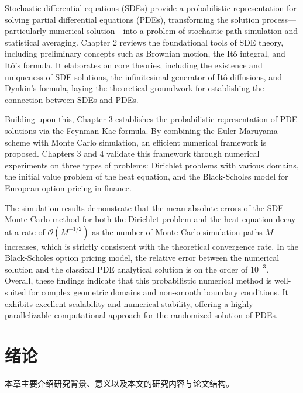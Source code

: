 \documentclass[oneside]{sysuthesis}
\begin{document}
\begin{abstract*}
  Stochastic differential equations (SDEs) provide a probabilistic representation for solving partial differential equations (PDEs), transforming the solution process—particularly numerical solution—into a problem of stochastic path simulation and statistical averaging. Chapter 2 reviews the foundational tools of SDE theory, including preliminary concepts such as Brownian motion, the It\^o integral, and It\^o's formula. It elaborates on core theories, including the existence and uniqueness of SDE solutions, the infinitesimal generator of It\^o diffusions, and Dynkin's formula, laying the theoretical groundwork for establishing the connection between SDEs and PDEs.
  
  Building upon this, Chapter 3 establishes the probabilistic representation of PDE solutions via the Feynman-Kac formula. By combining the Euler-Maruyama scheme with Monte Carlo simulation, an efficient numerical framework is proposed. Chapters 3 and 4 validate this framework through numerical experiments on three types of problems: Dirichlet problems with various domains, the initial value problem of the heat equation, and the Black-Scholes model for European option pricing in finance.
  
  The simulation results demonstrate that the mean absolute errors of the SDE-Monte Carlo method for both the Dirichlet problem and the heat equation decay at a rate of $\mathcal{O}(M^{-1/2})$ as the number of Monte Carlo simulation paths $M$ increases, which is strictly consistent with the theoretical convergence rate. In the Black-Scholes option pricing model, the relative error between the numerical solution and the classical PDE analytical solution is on the order of $10^{-3}$. Overall, these findings indicate that this probabilistic numerical method is well-suited for complex geometric domains and non-smooth boundary conditions. It exhibits excellent scalability and numerical stability, offering a highly parallelizable computational approach for the randomized solution of PDEs.
\end{abstract*}

\tableofcontents

\mainmatter

\chapter{绪论}

本章主要介绍研究背景、意义以及本文的研究内容与论文结构。
\end{document}
